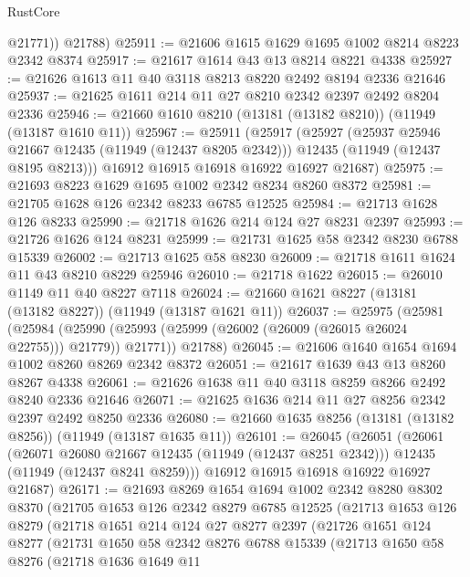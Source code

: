 \begin{lexlean}{RustCore}
\begin{coremodule}
          @21771))
      @21788)
@25911 := @21606 @1615 @1629 @1695 @1002 @8214 @8223 @2342 @8374
@25917 := @21617 @1614 @43 @13 @8214 @8221 @4338
@25927 := @21626 @1613 @11 @40 @3118 @8213 @8220 @2492 @8194 @2336 @21646
@25937 := @21625 @1611 @214 @11 @27 @8210 @2342 @2397 @2492 @8204 @2336
@25946 := @21660 @1610 @8210 (@13181 (@13182 @8210)) (@11949 (@13187 @1610 @11))
@25967 := @25911
    (@25917
      (@25927
        (@25937 @25946 @21667 @12435 (@11949 (@12437 @8205 @2342)))
        @12435
        (@11949 (@12437 @8195 @8213)))
      @16912
      @16915
      @16918
      @16922
      @16927
      @21687)
@25975 := @21693 @8223 @1629 @1695 @1002 @2342 @8234 @8260 @8372
@25981 := @21705 @1628 @126 @2342 @8233 @6785 @12525
@25984 := @21713 @1628 @126 @8233
@25990 := @21718 @1626 @214 @124 @27 @8231 @2397
@25993 := @21726 @1626 @124 @8231
@25999 := @21731 @1625 @58 @2342 @8230 @6788 @15339
@26002 := @21713 @1625 @58 @8230
@26009 := @21718 @1611 @1624 @11 @43 @8210 @8229 @25946
@26010 := @21718 @1622
@26015 := @26010 @1149 @11 @40 @8227 @7118
@26024 := @21660 @1621 @8227 (@13181 (@13182 @8227)) (@11949 (@13187 @1621 @11))
@26037 := @25975
    (@25981
      (@25984 (@25990 (@25993 (@25999 (@26002 (@26009 (@26015 @26024 @22755))) @21779)) @21771))
      @21788)
@26045 := @21606 @1640 @1654 @1694 @1002 @8260 @8269 @2342 @8372
@26051 := @21617 @1639 @43 @13 @8260 @8267 @4338
@26061 := @21626 @1638 @11 @40 @3118 @8259 @8266 @2492 @8240 @2336 @21646
@26071 := @21625 @1636 @214 @11 @27 @8256 @2342 @2397 @2492 @8250 @2336
@26080 := @21660 @1635 @8256 (@13181 (@13182 @8256)) (@11949 (@13187 @1635 @11))
@26101 := @26045
    (@26051
      (@26061
        (@26071 @26080 @21667 @12435 (@11949 (@12437 @8251 @2342)))
        @12435
        (@11949 (@12437 @8241 @8259)))
      @16912
      @16915
      @16918
      @16922
      @16927
      @21687)
@26171 := @21693
    @8269
    @1654
    @1694
    @1002
    @2342
    @8280
    @8302
    @8370
    (@21705
      @1653
      @126
      @2342
      @8279
      @6785
      @12525
      (@21713
        @1653
        @126
        @8279
        (@21718
          @1651
          @214
          @124
          @27
          @8277
          @2397
          (@21726
            @1651
            @124
            @8277
            (@21731
              @1650
              @58
              @2342
              @8276
              @6788
              @15339
              (@21713
                @1650
                @58
                @8276
                (@21718
                  @1636
                  @1649
                  @11

\end{coremodule}
\end{lexlean}
